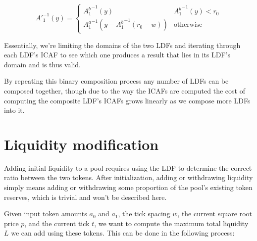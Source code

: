 \documentclass[twocolumn]{article}
\begin{document}
\begin{equation}
  A'^{-1}_1(y) =
    \begin{cases}
      {A_1^b}^{-1}(y) & {A_1^b}^{-1}(y) < r_0 \\
      {A_1^a}^{-1}(y - {A_1^b}^{-1}(r_0 - w)) & \text{otherwise}
    \end{cases}       
\end{equation}

Essentially, we're limiting the domains of the two LDFs and iterating through each LDF's ICAF to see which one produces a result that lies in its LDF's domain and is thus valid.

By repeating this binary composition process any number of LDFs can be composed together, though due to the way the ICAFs are computed the cost of computing the composite LDF's ICAFs grows linearly as we compose more LDFs into it.

\section{Liquidity modification}

Adding initial liquidity to a pool requires using the LDF to determine the correct ratio between the two tokens. After initialization, adding or withdrawing liquidity simply means adding or withdrawing some proportion of the pool's existing token reserves, which is trivial and won't be described here. 

Given input token amounts $a_0$ and $a_1$, the tick spacing $w$, the current square root price $p$, and the current tick $t$, we want to compute the maximum total liquidity $L$ we can add using these tokens. This can be done in the following process:
\end{document}
